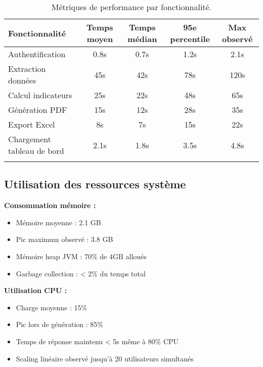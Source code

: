 \begin{longtable}{|l|c|c|c|c|}
    \hline
    \textbf{Fonctionnalité}    & \textbf{Temps moyen} & \textbf{Temps médian} & \textbf{95e percentile} & \textbf{Max observé} \\ \hline
    Authentification           & 0.8s                 & 0.7s                  & 1.2s                    & 2.1s                 \\ \hline
    Extraction données         & 45s                  & 42s                   & 78s                     & 120s                 \\ \hline
    Calcul indicateurs         & 25s                  & 22s                   & 48s                     & 65s                  \\ \hline
    Génération PDF             & 15s                  & 12s                   & 28s                     & 35s                  \\ \hline
    Export Excel               & 8s                   & 7s                    & 15s                     & 22s                  \\ \hline
    Chargement tableau de bord & 2.1s                 & 1.8s                  & 3.5s                    & 4.8s                 \\ \hline
    \caption{Métriques de performance par fonctionnalité.}
    \label{tab:performance-metriques}
\end{longtable}

\subsection{Utilisation des ressources système}

\textbf{Consommation mémoire :}
\begin{itemize}
    \item Mémoire moyenne : 2.1 GB
    \item Pic maximum observé : 3.8 GB
    \item Mémoire heap JVM : 70\% de 4GB alloués
    \item Garbage collection : < 2\% du temps total
\end{itemize}

\textbf{Utilisation CPU :}
\begin{itemize}
    \item Charge moyenne : 15\%
    \item Pic lors de génération : 85\%
    \item Temps de réponse maintenu < 5s même à 80\% CPU
    \item Scaling linéaire observé jusqu'à 20 utilisateurs simultanés
\end{itemize}

